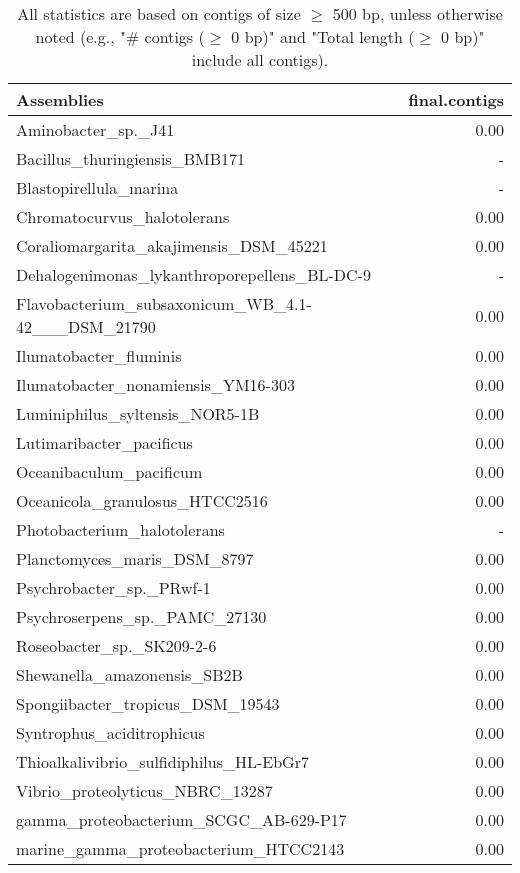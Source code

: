\documentclass[12pt,a4paper]{article}
\begin{document}
\begin{table}[ht]
\begin{center}
\caption{All statistics are based on contigs of size $\geq$ 500 bp, unless otherwise noted (e.g., "\# contigs ($\geq$ 0 bp)" and "Total length ($\geq$ 0 bp)" include all contigs).}
\begin{tabular}{|l*{1}{|r}|}
\hline
Assemblies & final.contigs \\ \hline
Aminobacter\_sp.\_J41 & 0.00 \\ \hline
Bacillus\_thuringiensis\_BMB171 & - \\ \hline
Blastopirellula\_marina & - \\ \hline
Chromatocurvus\_halotolerans & 0.00 \\ \hline
Coraliomargarita\_akajimensis\_DSM\_45221 & 0.00 \\ \hline
Dehalogenimonas\_lykanthroporepellens\_BL-DC-9 & - \\ \hline
Flavobacterium\_subsaxonicum\_WB\_4.1-42\_\_\_DSM\_21790 & 0.00 \\ \hline
Ilumatobacter\_fluminis & 0.00 \\ \hline
Ilumatobacter\_nonamiensis\_YM16-303 & 0.00 \\ \hline
Luminiphilus\_syltensis\_NOR5-1B & 0.00 \\ \hline
Lutimaribacter\_pacificus & 0.00 \\ \hline
Oceanibaculum\_pacificum & 0.00 \\ \hline
Oceanicola\_granulosus\_HTCC2516 & 0.00 \\ \hline
Photobacterium\_halotolerans & - \\ \hline
Planctomyces\_maris\_DSM\_8797 & 0.00 \\ \hline
Psychrobacter\_sp.\_PRwf-1 & 0.00 \\ \hline
Psychroserpens\_sp.\_PAMC\_27130 & 0.00 \\ \hline
Roseobacter\_sp.\_SK209-2-6 & 0.00 \\ \hline
Shewanella\_amazonensis\_SB2B & 0.00 \\ \hline
Spongiibacter\_tropicus\_DSM\_19543 & 0.00 \\ \hline
Syntrophus\_aciditrophicus & 0.00 \\ \hline
Thioalkalivibrio\_sulfidiphilus\_HL-EbGr7 & 0.00 \\ \hline
Vibrio\_proteolyticus\_NBRC\_13287 & 0.00 \\ \hline
gamma\_proteobacterium\_SCGC\_AB-629-P17 & 0.00 \\ \hline
marine\_gamma\_proteobacterium\_HTCC2143 & 0.00 \\ \hline
\end{tabular}
\end{center}
\end{table}
\end{document}
